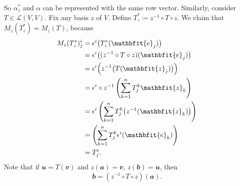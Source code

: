 \documentclass[math]{amznotes}
\theoremstyle{remark}
\begin{document}
So $\alpha^*_z$ and $\alpha$ can be represented with the same row vector. Similarly, consider $T \in \mathcal{L}(V, V)$. Fix any basis $z$ of $V$. Define $T^*_z \coloneqq z^{-1} \circ T \circ z$. We claim that $M_z(T^*_z) = M_z(T)$, because
\begin{align*}
    M_z(T^*_z)^i_j & = \epsilon^i\bigl(T^*_z(\mathbfit{e}_j)\bigr) \\
    & = \epsilon^i\bigl((z^{-1} \circ T \circ z)(\mathbfit{e}_j)\bigr) \\
    & = \epsilon^i\Bigl(z^{-1}\bigl(T(\mathbfit{z}_j)\bigr)\Bigr) \\
    & = \epsilon^i \circ z^{-1}\left(\sum_{k = 1}^{n}T^k_j\mathbfit{z}_k\right) \\
    & = \epsilon^i\left(\sum_{k = 1}^{n}T^k_j\bigl(z^{-1}(\mathbfit{z}_k)\bigr)\right) \\
    & = \left(\sum_{k = 1}^{n}T^k_j\epsilon^i(\mathbfit{e}_k)\right) \\
    & = T^i_j.
\end{align*}
Note that if $\mathbfit{u} = T(\mathbfit{v})$ and $z(\mathbfit{a}) = \mathbfit{v}$, $z(\mathbfit{b}) = \mathbfit{u}$, then 
\begin{equation*}
    \mathbfit{b} = \left(z^{-1} \circ T \circ z\right)(\mathbfit{a}).
\end{equation*}
\end{document}
